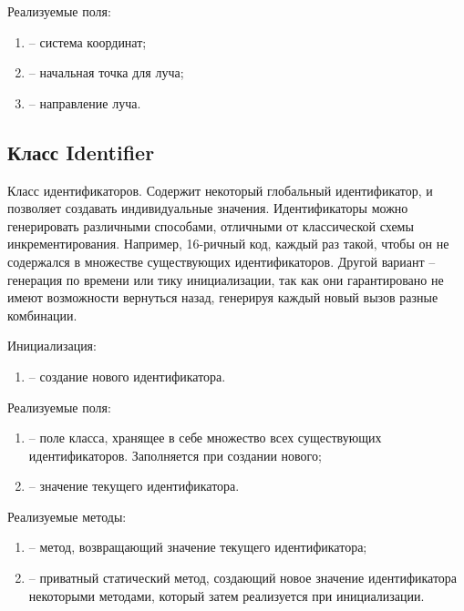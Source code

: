 	\noindent Реализуемые поля:
	\begin{enumerate}
		\item {} -- система координат;
		\item {} -- начальная точка для луча;
		\item {} -- направление луча.
	\end{enumerate}


\subsection{Класс Identifier}
	\noindent Класс идентификаторов. Содержит некоторый глобальный идентификатор, и позволяет создавать индивидуальные значения. Идентификаторы можно генерировать различными способами, отличными от классической схемы инкрементирования. Например, 16-ричный код, каждый раз такой, чтобы он не содержался в множестве существующих идентификаторов. Другой вариант -- генерация по времени или тику инициализации, так как они гарантировано не имеют возможности вернуться назад, генерируя каждый новый вызов разные комбинации.

	\noindent Инициализация:
	\begin{enumerate}
		\item {} -- создание нового идентификатора.
	\end{enumerate}

	\noindent Реализуемые поля:
	\begin{enumerate}
		\item {} -- поле класса, хранящее в себе множество всех существующих идентификаторов. Заполняется при создании нового;
		\item {} -- значение текущего идентификатора.
	\end{enumerate}

	\noindent Реализуемые методы:
	\begin{enumerate}
		\item {} -- метод, возвращающий значение текущего идентификатора;
		\item {} -- приватный статический метод, создающий новое значение идентификатора некоторыми методами, который затем реализуется при инициализации.
	\end{enumerate}


